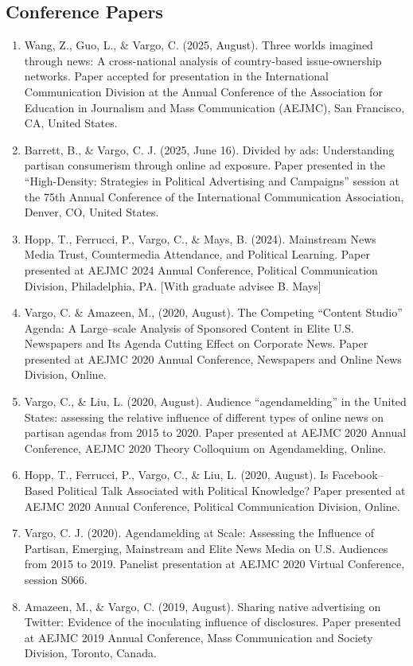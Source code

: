 \documentclass[11pt,letterpaper]{article}
\begin{document}
\subsection*{Conference Papers}
{\small
\begin{enumerate}
\item Wang, Z., Guo, L., \& Vargo, C. (2025, August). Three worlds imagined through news: A cross-national analysis of country-based issue-ownership networks. Paper accepted for presentation in the International Communication Division at the Annual Conference of the Association for Education in Journalism and Mass Communication (AEJMC), San Francisco, CA, United States.
\item Barrett, B., \& Vargo, C. J. (2025, June 16). Divided by ads: Understanding partisan consumerism through online ad exposure. Paper presented in the ``High-Density: Strategies in Political Advertising and Campaigns'' session at the 75th Annual Conference of the International Communication Association, Denver, CO, United States.
\item Hopp, T., Ferrucci, P., Vargo, C., \& Mays, B. (2024). Mainstream News Media Trust, Countermedia Attendance, and Political Learning. Paper presented at AEJMC 2024 Annual Conference, Political Communication Division, Philadelphia, PA. [With graduate advisee B. Mays]
\item Vargo, C. \& Amazeen, M., (2020, August). The Competing ``Content Studio'' Agenda: A Large--scale Analysis of Sponsored Content in Elite U.S. Newspapers and Its Agenda Cutting Effect on Corporate News. Paper presented at AEJMC 2020 Annual Conference, Newspapers and Online News Division, Online.
\item Vargo, C., \& Liu, L. (2020, August). Audience ``agendamelding'' in the United States: assessing the relative influence of different types of online news on partisan agendas from 2015 to 2020. Paper presented at AEJMC 2020 Annual Conference, AEJMC 2020 Theory Colloquium on Agendamelding, Online.
\item Hopp, T., Ferrucci, P., Vargo, C., \& Liu, L. (2020, August). Is Facebook--Based Political Talk Associated with Political Knowledge? Paper presented at AEJMC 2020 Annual Conference, Political Communication Division, Online.
\item Vargo, C. J. (2020). Agendamelding at Scale: Assessing the Influence of Partisan, Emerging, Mainstream and Elite News Media on U.S. Audiences from 2015 to 2019. Panelist presentation at AEJMC 2020 Virtual Conference, session S066.
\item Amazeen, M., \& Vargo, C. (2019, August). Sharing native advertising on Twitter: Evidence of the inoculating influence of disclosures. Paper presented at AEJMC 2019 Annual Conference, Mass Communication and Society Division, Toronto, Canada.

\end{enumerate}}
\end{document}
